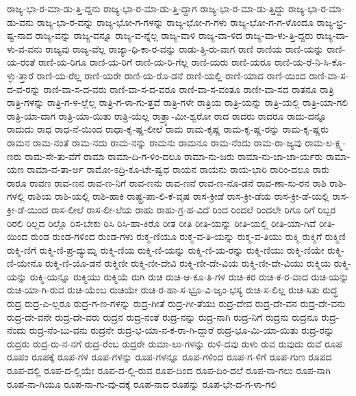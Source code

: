 {ರಾಜ್ಯ-ಭಾ-ರ-ಮಾ-ಡು-ತ್ತಿ-ದ್ದನು
ರಾಜ್ಯ-ಭಾ-ರ-ಮಾ-ಡು-ತ್ತಿ-ದ್ದಾಗ
ರಾಜ್ಯ-ಭಾ-ರ-ಮಾ-ಡು-ತ್ತಿದ್ದು
ರಾಜ್ಯ-ಭಾ-ರ-ಮಾ-ಡು-ವನು
ರಾಜ್ಯ-ಭಾ-ರ-ವನ್ನು
ರಾಜ್ಯ-ಭೋ-ಗ-ಗಳನ್ನು
ರಾಜ್ಯ-ಭೋ-ಗ-ಗಳು
ರಾಜ್ಯ-ಭೋ-ಗ-ಗ-ಳೊಂದೂ
ರಾಜ್ಯ-ಭ್ರ-ಷ್ಟ-ನಾದ
ರಾಜ್ಯ-ವನ್ನು
ರಾಜ್ಯ-ವನ್ನೂ
ರಾಜ್ಯ-ವ-ನ್ನೆಲ್ಲ
ರಾಜ್ಯ-ವಾಳಿ
ರಾಜ್ಯ-ವಾ-ಳಿದ
ರಾಜ್ಯ-ವಾ-ಳು-ತ್ತಿ-ದ್ದರು
ರಾಜ್ಯ-ವಾ-ಳು-ವ-ವನು
ರಾಜ್ಯವು
ರಾಜ್ಯ-ವೆಲ್ಲ
ರಾಜ್ಯಾ-ಧಿ-ಕಾ-ರ-ವನ್ನು
ರಾಡು-ತ್ತಿ-ರು-ವಾಗ
ರಾಣಿ
ರಾಣಿಯ
ರಾಣಿ-ಯನ್ನು
ರಾಣಿ-ಯ-ರಂತೆ
ರಾಣಿ-ಯ-ರಿಗೂ
ರಾಣಿ-ಯ-ರಿಗೆ
ರಾಣಿ-ಯ-ರಿ-ಗೆಲ್ಲ
ರಾಣಿ-ಯರು
ರಾಣಿ-ಯರೂ
ರಾಣಿ-ಯ-ರೆ-ನಿ-ಸಿ-ಕೊ-ಳ್ಳು-ತ್ತಾರೆ
ರಾಣಿ-ಯ-ರೆಲ್ಲ
ರಾಣಿ-ಯರೇ
ರಾಣಿ-ಯ-ರೊ-ಡನೆ
ರಾಣಿ-ಯಲ್ಲಿ
ರಾಣಿ-ಯಾದ
ರಾಣಿ-ಯಿಂದ
ರಾಣಿ-ವಾ-ಸ-ದ-ವ-ರನ್ನು
ರಾಣಿ-ವಾ-ಸ-ದ-ವರು
ರಾಣಿ-ವಾ-ಸ-ದ-ವರೂ
ರಾಣಿ-ವಾ-ಸ-ವಂತೂ
ರಾಣೀ-ವಾ-ಸದ
ರಾತನೂ
ರಾತ್ರಿ
ರಾತ್ರಿ-ಗಳನ್ನು
ರಾತ್ರಿ-ಗ-ಳ-ಲ್ಲೆಲ್ಲ
ರಾತ್ರಿ-ಗ-ಳಾ-ಗು-ತ್ತವೆ
ರಾತ್ರಿ-ಗಳೇ
ರಾತ್ರಿಯ
ರಾತ್ರಿ-ಯನ್ನು
ರಾತ್ರಿ-ಯಲ್ಲಿ
ರಾತ್ರಿ-ಯಾ-ಗಲಿ
ರಾತ್ರಿ-ಯಾ-ದಾಗ
ರಾತ್ರಿ-ಯಾ-ಯಿತು
ರಾತ್ರಿ-ಯೆಲ್ಲ
ರಾತ್ರ್ಯಾ-ಮೀ-ಶ್ವರೋ
ರಾದ
ರಾದರು
ರಾದರೂ
ರಾದು-ದನ್ನೂ
ರಾದುದು
ರಾಧ
ರಾಧ-ನೆ-ಯಿಂದ
ರಾಧಾ-ಕೃ-ಷ್ಣ-ಲೀಲೆ
ರಾಮ
ರಾಮ-ಕೃಷ್ಣ
ರಾಮ-ಕೃ-ಷ್ಣ-ರನ್ನು
ರಾಮ-ಕೃ-ಷ್ಣರು
ರಾಮನ
ರಾಮ-ನಂತೆ
ರಾಮ-ನದು
ರಾಮ-ನನ್ನು
ರಾಮನು
ರಾಮನೂ
ರಾಮ-ನೆಂದು
ರಾಮ-ರಾ-ಜ್ಯವು
ರಾಮ-ಲ-ಕ್ಷ್ಮ-ಣರು
ರಾಮ-ಸೇ-ತು-ವೆಗೆ
ರಾಮಾ
ರಾಮಾ-ದಿ-ಗ-ಳಿಂ-ದಲೂ
ರಾಮಾ-ನು-ಜರು
ರಾಮಾ-ನು-ಜಾ-ಚಾ-ರ್ಯರು
ರಾಮಾ-ಯಣ
ರಾಮಾ-ವ-ತಾ-ರ್ಅ
ರಾಮೋ-ಽದ್ರಿ-ಕೂ-ಟೇ-ಷ್ವಥ
ರಾಯನ
ರಾಯನು
ರಾಯ-ಭಾರಿ
ರಾರಿಂ-ದಲೂ
ರಾರು
ರಾರೂ
ರಾವಣ
ರಾವ-ಣನ
ರಾವ-ಣ-ನಿಗೆ
ರಾವ-ಣನು
ರಾವ-ಣನೆ
ರಾವ-ಣ-ನೊ-ಡನೆ
ರಾವ-ಣಾ-ಸು-ರನ
ರಾಶಿ
ರಾಶಿ-ಗಳಲ್ಲಿ
ರಾಶಿಯ
ರಾಶಿ-ಯಲ್ಲಿ
ರಾಶಿ-ಹಾಕಿ
ರಾಷ್ಟ್ರ-ಪಾ-ಲಿ-ಕೆ-ವೃಷ
ರಾಸ-ಕ್ರೀಡೆ
ರಾಸ-ಕ್ರೀ-ಡೆಯ
ರಾಸ-ಕ್ರೀ-ಡೆ-ಯಲ್ಲಿ
ರಾಸ-ಕ್ರೀ-ಡೆ-ಯಿಂದ
ರಾಸ-ಲೀಲೆ
ರಾಸ-ಲೀ-ಲೆಯ
ರಾಹು
ರಾಹು-ಗ್ರ-ಹ-ವಿದೆ
ರಿಂದ
ರಿಂದಲೆ
ರಿಂದಲೇ
ರಿಗೂ
ರಿಗೆ
ರಿಬ್ಬರ
ರಿರಲಿ
ರಿಲ್ಲದ
ರಿಲ್ಲೊ
ರಿಸ-ಬೇಕು
ರಿಸಿ
ರಿಸಿ-ಹಾ-ಕಿರೊ
ರೀತ
ರೀತಿ
ರೀತಿ-ಯನ್ನು
ರೀತಿ-ಯಲ್ಲಿ
ರೀತಿ-ಯಾ-ಗಿವೆ
ರೀತಿ-ಯಿಂದ
ರುಂಡ
ರುಂಡ-ಗಳಿಂದ
ರುಂಡ-ಗಳು
ರುಕ್ಮ-ಣಿಯೂ
ರುಕ್ಮ-ವ-ತಿ-ಯನ್ನು
ರುಕ್ಮ-ವ-ತಿಯು
ರುಕ್ಮಿ
ರುಕ್ಮಿಗೆ
ರುಕ್ಮಿಣಿ
ರುಕ್ಮಿ-ಣಿಗೆ
ರುಕ್ಮಿ-ಣಿ-ಪ್ರ-ದ್ಯುಮ್ನ
ರುಕ್ಮಿ-ಣಿಯ
ರುಕ್ಮಿ-ಣಿ-ಯನ್ನು
ರುಕ್ಮಿ-ಣಿ-ಯ-ರನ್ನು
ರುಕ್ಮಿ-ಣಿಯು
ರುಕ್ಮಿ-ಣಿಯೇ
ರುಕ್ಮಿ-ಣಿ-ಯೇನೊ
ರುಕ್ಮಿ-ಣಿ-ಯೊ-ಡನೆ
ರುಕ್ಮಿಣೀ
ರುಕ್ಮಿ-ಣೀ-ದೇವಿ
ರುಕ್ಮಿ-ಣೀ-ದೇ-ವಿಯ
ರುಕ್ಮಿ-ಣೀ-ದೇ-ವಿಯು
ರುಕ್ಮಿಯ
ರುಕ್ಮಿ-ಯನ್ನು
ರುಕ್ಮಿ-ಯನ್ನೂ
ರುಕ್ಮಿಯು
ರುಕ್ಮಿಯೆ
ರುಗಿ
ರುಚಿ
ರುಚಿ-ಆ-ಕೂ-ತಿ-ಗಳ
ರುಚಿ-ಕರ
ರುಚಿ-ಕ-ರ-ವಾದ
ರುಚಿ-ಯನ್ನು
ರುಚಿ-ಯಾ-ಗಿ-ರುವ
ರುಚಿ-ಯೆಂಬ
ರುಚಿಯೇ
ರುಚಿ-ರ-ಹಾ-ಸ-ಭ್ರೂ-ವಿ-ಜೃಂ-ಭಸ್ಯ
ರುಚಿ-ಸ-ಲಿಲ್ಲ
ರುಚಿ-ಸಿತು
ರುದ್ಧ
ರುದ್ರ
ರುದ್ರ-ಎ-ಲ್ಲರೂ
ರುದ್ರ-ಗ-ಣ-ಗಳನ್ನು
ರುದ್ರ-ಗೀತೆ
ರುದ್ರ-ಗೀ-ತೆಯು
ರುದ್ರ-ದೇವ
ರುದ್ರ-ದೇ-ವನ
ರುದ್ರ-ದೇ-ವನು
ರುದ್ರ-ದೇ-ವನೇ
ರುದ್ರ-ದೇ-ವರು
ರುದ್ರನ
ರುದ್ರ-ನಂತೆ
ರುದ್ರ-ನನ್ನು
ರುದ್ರ-ನಾಗಿ
ರುದ್ರ-ನಿಗೆ
ರುದ್ರನು
ರುದ್ರನೂ
ರುದ್ರ-ನೆಂದು
ರುದ್ರ-ನೆಂ-ಬು-ವನು
ರುದ್ರನೇ
ರುದ್ರ-ಭ-ಯಾ-ನ-ಕ-ರಾ-ಗಿ-ದ್ದಾರೆ
ರುದ್ರ-ಭೂ-ಮಿ-ಯಾ-ಯಿತು
ರುದ್ರ-ರನ್ನು
ರುದ್ರರು
ರುದ್ರ-ರು-ನ-ನಗೆ
ರುದ್ರ-ರೆಂಬ
ರುದ್ರರೇ
ರುಮಾ-ಲು-ಗಳನ್ನು
ರುಳಿ-ದವು
ರುಳು
ರುವ
ರುವುದು
ರುವೆ
ರೂಪ
ರೂಪಂ
ರೂಪಕ್ಕೆ
ರೂಪ-ಗಳ
ರೂಪ-ಗಳನ್ನು
ರೂಪ-ಗಳನ್ನೂ
ರೂಪ-ಗಳಿಂದ
ರೂಪ-ಗ-ಳಿಗೆ
ರೂಪ-ಗುಣ
ರೂಪದ
ರೂಪ-ದಲ್ಲಿ
ರೂಪ-ದ-ಲ್ಲಿಯೇ
ರೂಪ-ದ-ಲ್ಲಿ-ರುವ
ರೂಪ-ದಿಂದ
ರೂಪ-ದಿಂ-ದಲೆ
ರೂಪ-ನಾ-ಗಲು
ರೂಪ-ನಾಗಿ
ರೂಪ-ನಾ-ಗಿಯೂ
ರೂಪ-ನಾ-ಗು-ವು-ದಕ್ಕೆ
ರೂಪ-ನಾದ
ರೂಪನ್ನು
ರೂಪ-ಭೇ-ದ-ಗ-ಳಾ-ಗಲಿ
}

